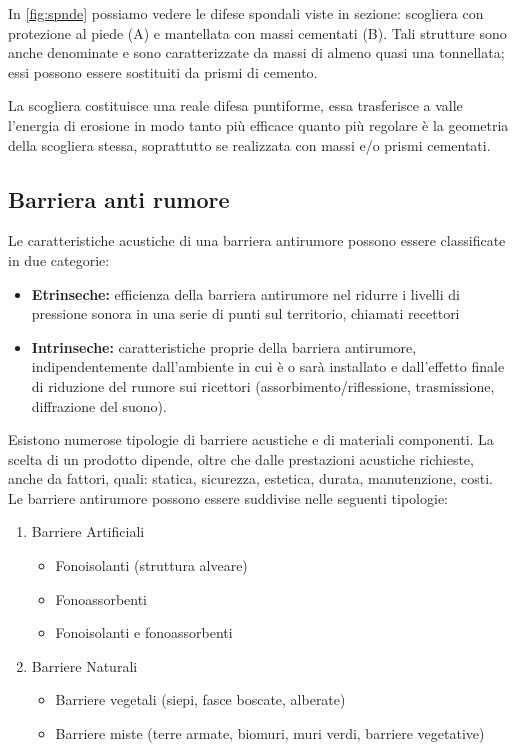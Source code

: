 In \cref{fig:spnde} possiamo vedere le difese spondali viste in sezione: scogliera con protezione al piede (A) e mantellata con massi cementati (B). Tali strutture sono anche denominate  e sono caratterizzate da massi di almeno quasi una tonnellata; essi possono essere sostituiti da prismi di cemento. 


La scogliera costituisce una reale difesa puntiforme, essa trasferisce a valle l’energia di erosione in modo tanto più efficace quanto più regolare è la geometria della scogliera stessa, soprattutto se realizzata con massi e/o prismi cementati.

\subsection{Barriera anti rumore}

Le caratteristiche acustiche di una barriera antirumore possono essere classificate in due categorie: 
\begin{itemize}
	\item \textbf{Etrinseche:} efficienza della barriera antirumore nel ridurre i livelli di pressione sonora in una serie di punti sul territorio, chiamati recettori
	\item \textbf{Intrinseche:} caratteristiche proprie della barriera antirumore, indipendentemente dall'ambiente in cui è o sarà installato e dall'effetto finale di riduzione del rumore sui ricettori (assorbimento/riflessione, trasmissione, diffrazione del suono).
\end{itemize}

\noindent
Esistono numerose tipologie di barriere acustiche e di materiali componenti. La scelta di un prodotto dipende, oltre che dalle prestazioni acustiche richieste, anche da fattori, quali: statica, sicurezza, estetica, durata, manutenzione, costi. Le barriere antirumore possono essere suddivise nelle seguenti tipologie: 

\begin{enumerate}
	\item Barriere Artificiali
	\begin{itemize}
		\item Fonoisolanti (struttura alveare)
		\item Fonoassorbenti 
		\item Fonoisolanti e fonoassorbenti
	\end{itemize}
	
	\item Barriere Naturali
	\begin{itemize}
		\item Barriere vegetali (siepi, fasce boscate, alberate) 
		\item Barriere miste (terre armate, biomuri, muri verdi, barriere vegetative)
	\end{itemize}
\end{enumerate}


